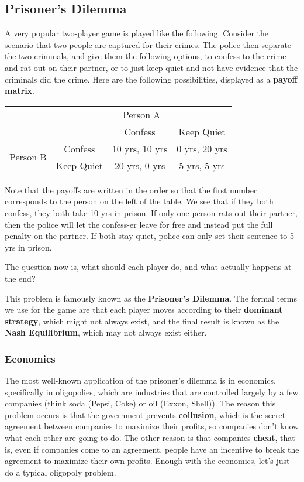 \subsection{Prisoner's Dilemma}
A very popular two-player game is played like the following. Consider the scenario that two people are captured for their crimes. The police then separate the two criminals, and give them the following options, to confess to the crime and rat out on their partner, or to just keep quiet and not have evidence that the criminals did the crime. Here are the following possibilities, displayed as a \textbf{payoff matrix}.

\begin{center}
\renewcommand{\arraystretch}{1.5} %
\begin{tabular}{cc|c|c}
     &\multicolumn{3}{c}{Person A} \\
     && Confess & Keep Quiet \\
     \cline{2-4}
     \multirow{2}{*}{Person B}&Confess & 10 yrs, 10 yrs & 0 yrs, 20 yrs \\
     &Keep Quiet & 20 yrs, 0 yrs & 5 yrs, 5 yrs
\end{tabular}
\end{center}

Note that the payoffs are written in the order so that the first number corresponds to the person on the left of the table. We see that if they both confess, they both take 10 yrs in prison. If only one person rats out their partner, then the police will let the confess-er leave for free and instead put the full penalty on the partner. If both stay quiet, police can only set their sentence to 5 yrs in prison.

The question now is, what should each player do, and what actually happens at the end?

This problem is famously known as the \textbf{Prisoner's Dilemma}. The formal terms we use for the game are that each player moves according to their \textbf{dominant strategy}, which might not always exist, and the final result is known as the \textbf{Nash Equilibrium}, which may not always exist either.

\subsubsection{Economics}
The most well-known application of the prisoner's dilemma is in economics, specifically in oligopolies, which are industries that are controlled largely by a few companies (think soda (Pepsi, Coke) or oil (Exxon, Shell)). The reason this problem occurs is that the government prevents \textbf{collusion}, which is the secret agreement between companies to maximize their profits, so companies don't know what each other are going to do. The other reason is that companies \textbf{cheat}, that is, even if companies come to an agreement, people have an incentive to break the agreement to maximize their own profits. Enough with the economics, let's just do a typical oligopoly problem.

